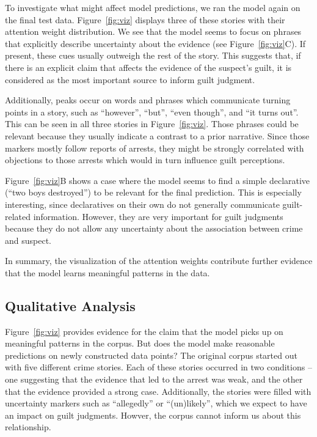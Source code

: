 \documentclass[11pt,a4paper]{article}
\begin{document}
To investigate what might affect model predictions, we ran the model again on the final test data. Figure~\ref{fig:viz} displays three of these stories with their attention weight distribution.
We see that the model seems to focus on phrases that explicitly describe uncertainty about the evidence (see Figure~\ref{fig:viz}C). If present, these cues usually outweigh the rest of the story. This suggests that, if there is an explicit claim that affects the evidence of the suspect's guilt, it is considered as the most important source to inform guilt judgment.

Additionally, peaks occur on words and phrases which communicate turning points in a story, such as ``however'', ``but'', ``even though'', and ``it turns out''. This can be seen in all three stories in Figure~\ref{fig:viz}. Those phrases could be relevant because they usually indicate a contrast to a prior narrative. Since those markers mostly follow reports of arrests, they might be strongly correlated with objections to those arrests which would in turn influence guilt perceptions.

Figure~\ref{fig:viz}B shows a case where the model seems to find a simple declarative (``two boys destroyed'') to be relevant for the final prediction. This is especially interesting, since declaratives on their own do not generally communicate guilt-related information. However, they are very important for guilt judgments because they do not allow any uncertainty about the association between crime and suspect.

In summary, the visualization of the attention weights contribute further evidence that the model learns meaningful patterns in the data.


\subsection{Qualitative Analysis}

Figure~\ref{fig:viz} provides evidence for the claim that the model picks up on meaningful patterns in the corpus. But does the model make reasonable predictions on newly constructed data points?  The original corpus started out with five different crime stories. Each of these stories occurred in two conditions -- one suggesting that the evidence that led to the arrest was weak, and the other that the evidence provided a strong case. Additionally, the stories were filled with uncertainty markers such as ``allegedly'' or ``(un)likely'', which we expect to have an impact on guilt judgments. Howver, the corpus cannot inform us about this relationship.
\end{document}
